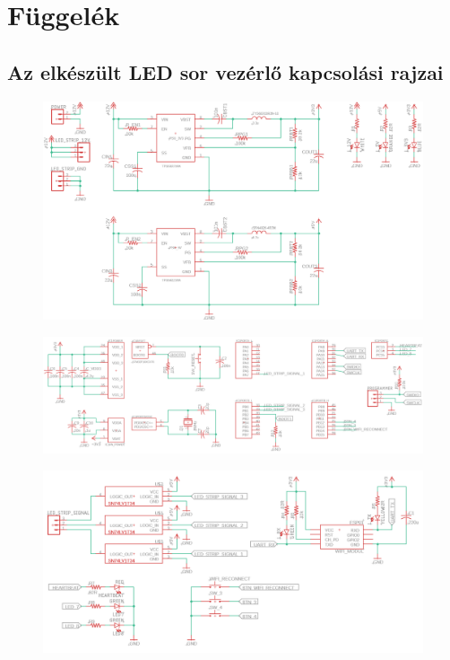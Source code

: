 \documentclass[../main.tex]{subfiles}
\begin{document}
\section{Függelék}
    \subsection{Az elkészült LED sor vezérlő kapcsolási rajzai}
        \begin{figure}[h!]
            \centering
            \includegraphics[width=20cm, angle=90]{resources/pcb_res/big_schematic01.png}
            \caption{}
            \label{fig:android_things}
        \end{figure}

        \begin{figure}[h!]
            \centering
            \includegraphics[width=23cm, angle=90]{resources/pcb_res/big_schematic02.png}
            \caption{}
            \label{fig:android_things}
        \end{figure}
        
        \begin{figure}[h!]
            \centering
            \includegraphics[width=20cm, angle=90]{resources/pcb_res/big_schematic03.png}
            \caption{}
            \label{fig:android_things}
        \end{figure}
        
\end{document}
